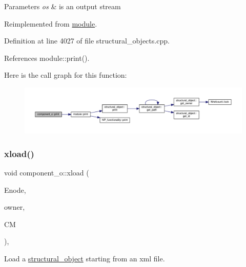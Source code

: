 \begin{DoxyParams}{Parameters}
{\em os} & is an output stream \\
\hline
\end{DoxyParams}


Reimplemented from \hyperlink{classmodule_a91f3995762c61b4bc46bd0520d72dc0a}{module}.



Definition at line 4027 of file structural\+\_\+objects.\+cpp.



References module\+::print().

Here is the call graph for this function\+:
\nopagebreak
\begin{figure}[H]
\begin{center}
\leavevmode
\includegraphics[width=350pt]{de/d6c/classcomponent__o_af842a5ea3400ce76c5fa2b9b33bcbf12_cgraph}
\end{center}
\end{figure}
\mbox{\label{classcomponent__o_a988fbc4d1b4b677c8384c5781917dd1f}} 
\subsubsection{\texorpdfstring{xload()}{xload()}}
{\footnotesize\ttfamily void component\+\_\+o\+::xload (\begin{DoxyParamCaption}\item[{const \hyperlink{classxml__element}{xml\+\_\+element} $\ast$}]{Enode,  }\item[{\hyperlink{structural__objects_8hpp_a8ea5f8cc50ab8f4c31e2751074ff60b2}{structural\+\_\+object\+Ref}}]{owner,  }\item[{\hyperlink{structural__manager_8hpp_ab3136f0e785d8535f8d252a7b53db5b5}{structural\+\_\+manager\+Ref} const \&}]{CM }\end{DoxyParamCaption})\hspace{0.3cm}{\ttfamily [override]}, {\ttfamily [virtual]}}



Load a \hyperlink{classstructural__object}{structural\+\_\+object} starting from an xml file. 


